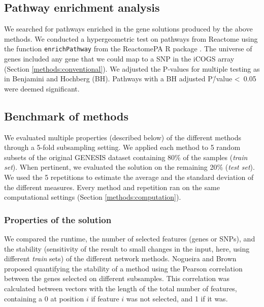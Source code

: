 \documentclass[10pt,letterpaper]{article}
\begin{document}
\subsection{Pathway enrichment analysis}
\label{methods:pathway_enrichment}

We searched for pathways enriched in the gene solutions produced by the above methods. We conducted a hypergeometric test on pathways from Reactome \cite{Jassal2019} using the function \texttt{enrichPathway} from the ReactomePA R package \cite{Yu2016}. The universe of genes included any gene that we could map to a SNP in the iCOGS array (Section \ref{methods:conventional}). We adjusted the P-values for multiple testing as in Benjamini and Hochberg \cite{Benjamini1995} (BH). Pathways with a BH adjusted P\=/value \textless~0.05 were deemed significant.

\subsection{Benchmark of methods}
\label{methods:benchmark}

We evaluated multiple properties (described below) of the different methods through a 5-fold subsampling setting. We applied each method to 5 random subsets of the original GENESIS dataset containing 80\% of the samples (\emph{train set}). When pertinent, we evaluated the solution on the remaining 20\% (\emph{test set}). We used the 5 repetitions to estimate the average and the standard deviation of the different measures. Every method and repetition ran on the same computational settings (Section \ref{methods:computation}).

\subsubsection{Properties of the solution}
\label{methods:algorithm_comparison}

We compared the runtime, the number of selected features (genes or SNPs), and the stability (sensitivity of the result to small changes in the input, here, using different \emph{train} sets) of the different network methods. Nogueira and Brown \cite{nogueira_measuring_2016} proposed quantifying the stability of a method using the Pearson correlation between the genes selected on different subsamples. This correlation was calculated between vectors with the length of the total number of features, containing a 0 at position $i$ if feature $i$ was not selected, and 1 if it was.
\end{document}
